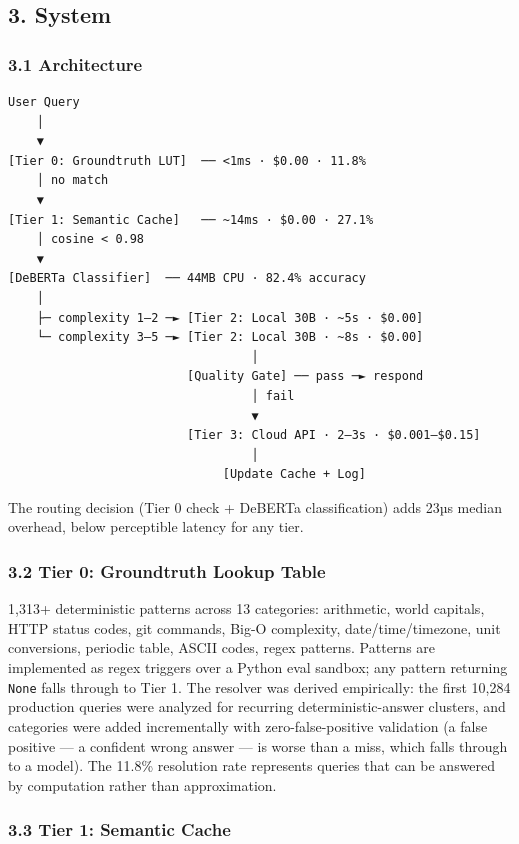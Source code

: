 \subsection{3. System}\label{system}

\subsubsection{3.1 Architecture}\label{architecture}

\begin{verbatim}
User Query
    │
    ▼
[Tier 0: Groundtruth LUT]  ── <1ms · $0.00 · 11.8%
    │ no match
    ▼
[Tier 1: Semantic Cache]   ── ~14ms · $0.00 · 27.1%
    │ cosine < 0.98
    ▼
[DeBERTa Classifier]  ── 44MB CPU · 82.4% accuracy
    │
    ├─ complexity 1–2 ─► [Tier 2: Local 30B · ~5s · $0.00]
    └─ complexity 3–5 ─► [Tier 2: Local 30B · ~8s · $0.00]
                                  │
                         [Quality Gate] ── pass ─► respond
                                  │ fail
                                  ▼
                         [Tier 3: Cloud API · 2–3s · $0.001–$0.15]
                                  │
                              [Update Cache + Log]
\end{verbatim}

The routing decision (Tier 0 check + DeBERTa classification) adds 23µs median overhead, below perceptible latency for any tier.

\subsubsection{3.2 Tier 0: Groundtruth Lookup Table}\label{tier-0-groundtruth-lookup-table}

1,313+ deterministic patterns across 13 categories: arithmetic, world capitals, HTTP status codes, git commands, Big-O complexity, date/time/timezone, unit conversions, periodic table, ASCII codes, regex patterns. Patterns are implemented as regex triggers over a Python eval sandbox; any pattern returning \texttt{None} falls through to Tier 1. The resolver was derived empirically: the first 10,284 production queries were analyzed for recurring deterministic-answer clusters, and categories were added incrementally with zero-false-positive validation (a false positive --- a confident wrong answer --- is worse than a miss, which falls through to a model). The 11.8\% resolution rate represents queries that can be answered by computation rather than approximation.

\subsubsection{3.3 Tier 1: Semantic Cache}\label{tier-1-semantic-cache}

